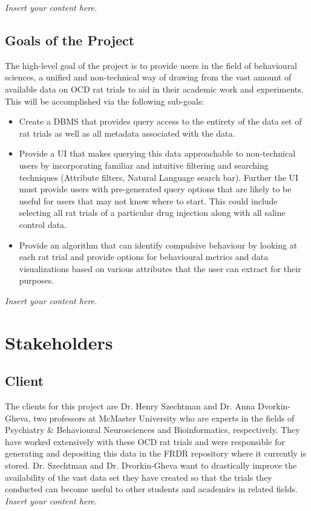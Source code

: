 \documentclass[12pt]{article}
\newcommand{\lips}{\textit{Insert your content here.}}
\begin{document}
\lips
\subsection{Goals of the Project}

\par{The high-level goal of the project is to provide users in the field of behavioural sciences,
a unified and non-technical way of drawing from the vast amount of available data on OCD rat trials
to aid in their academic work and experiments. This will be accomplished via the following sub-goals:}

\begin{itemize}
    \item Create a DBMS that provides query access to the entirety of the data set of rat trials as well as all metadata associated with the data.
    \item Provide a UI that makes querying this data approachable to non-technical users by incorporating familiar and intuitive filtering and searching techniques
    (Attribute filters, Natural Language search bar). Further the UI must provide users with pre-generated query options that are likely to
    be useful for users that may not know where to start. This could include selecting all rat trials of a particular drug injection along with
    all saline control data.
    \item Provide an algorithm that can identify compulsive behaviour by looking at each rat trial
    and provide options for behavioural metrics and data visualizations based on various attributes that the user can extract 
    for their purposes.
\end{itemize}


\lips
\section{Stakeholders}
\subsection{Client}

\par{The clients for this project are Dr. Henry Szechtman and Dr. Anna Dvorkin-Gheva, two professors at McMaster University who are experts in
the fields of Psychiatry & Behavioural Neurosciences and Bioinformatics, respectively. They have worked extensively with these OCD rat trials and
were responsible for generating and depositing this data in the FRDR repository where it currently is stored. Dr. Szechtman and Dr. Dvorkin-Gheva want
to drastically improve the availability of the vast data set they have created so that the trials they conducted can become useful to other students and academics in related fields.}
\lips
\end{document}
